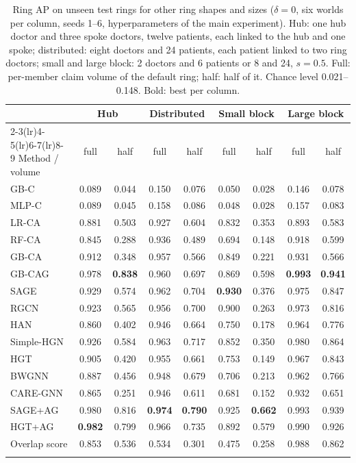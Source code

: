 \documentclass[pdflatex,sn-vancouver-num]{sn-jnl}
\begin{document}
\begin{table}[h]
\caption{Ring AP on unseen test rings for other ring shapes and sizes ($\delta=0$, six worlds per column, seeds 1--6, hyperparameters of the main experiment). Hub: one hub doctor and three spoke doctors, twelve patients, each linked to the hub and one spoke; distributed: eight doctors and 24 patients, each patient linked to two ring doctors; small and large block: 2 doctors and 6 patients or 8 and 24, $s=0.5$. Full: per-member claim volume of the default ring; half: half of it. Chance level 0.021--0.148. Bold: best per column.}\label{tab:shapes}
\scriptsize
\setlength{\tabcolsep}{3.5pt}
\begin{tabular}{@{}lcccccccc@{}}
\toprule
 & \multicolumn{2}{c}{Hub} & \multicolumn{2}{c}{Distributed} & \multicolumn{2}{c}{Small block} & \multicolumn{2}{c}{Large block} \\
\cmidrule(lr){2-3}\cmidrule(lr){4-5}\cmidrule(lr){6-7}\cmidrule(lr){8-9}
Method / volume & full & half & full & half & full & half & full & half \\
\midrule
GB-C & 0.089 & 0.044 & 0.150 & 0.076 & 0.050 & 0.028 & 0.146 & 0.078 \\
MLP-C & 0.089 & 0.045 & 0.158 & 0.086 & 0.048 & 0.028 & 0.157 & 0.083 \\
LR-CA & 0.881 & 0.503 & 0.927 & 0.604 & 0.832 & 0.353 & 0.893 & 0.583 \\
RF-CA & 0.845 & 0.288 & 0.936 & 0.489 & 0.694 & 0.148 & 0.918 & 0.599 \\
GB-CA & 0.912 & 0.348 & 0.957 & 0.566 & 0.849 & 0.221 & 0.931 & 0.566 \\
GB-CAG & 0.978 & \textbf{0.838} & 0.960 & 0.697 & 0.869 & 0.598 & \textbf{0.993} & \textbf{0.941} \\
\midrule
SAGE & 0.929 & 0.574 & 0.962 & 0.704 & \textbf{0.930} & 0.376 & 0.975 & 0.847 \\
RGCN & 0.923 & 0.565 & 0.956 & 0.700 & 0.900 & 0.263 & 0.973 & 0.816 \\
HAN & 0.860 & 0.402 & 0.946 & 0.664 & 0.750 & 0.178 & 0.964 & 0.776 \\
Simple-HGN & 0.926 & 0.584 & 0.963 & 0.717 & 0.852 & 0.350 & 0.980 & 0.864 \\
HGT & 0.905 & 0.420 & 0.955 & 0.661 & 0.753 & 0.149 & 0.967 & 0.843 \\
\midrule
BWGNN & 0.887 & 0.456 & 0.948 & 0.679 & 0.706 & 0.213 & 0.962 & 0.766 \\
CARE-GNN & 0.865 & 0.251 & 0.946 & 0.611 & 0.681 & 0.152 & 0.932 & 0.651 \\
\midrule
SAGE+AG & 0.980 & 0.816 & \textbf{0.974} & \textbf{0.790} & 0.925 & \textbf{0.662} & 0.993 & 0.939 \\
HGT+AG & \textbf{0.982} & 0.799 & 0.966 & 0.735 & 0.892 & 0.579 & 0.990 & 0.926 \\
Overlap score & 0.853 & 0.536 & 0.534 & 0.301 & 0.475 & 0.258 & 0.988 & 0.862 \\
\botrule
\end{tabular}
\end{table}
\end{document}
